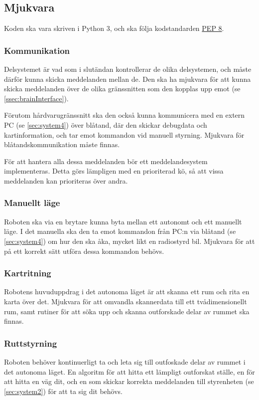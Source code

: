 \documentclass[a4paper,11pt]{article}
\begin{document}
\subsection{Mjukvara}

Koden ska vara skriven i Python 3, och ska följa kodstandarden \href{https://www.python.org/dev/peps/pep-0008/}{PEP 8}.

\subsubsection{Kommunikation}
Delsystemet är vad som i slutändan kontrollerar de olika delsystemen, och måste därför kunna skicka meddelanden mellan de. Den ska ha mjukvara för att kunna skicka meddelanden över de olika gränssnitten som den kopplas upp emot (se \ref{ssec:brainInterface}).

Förutom hårdvarugränssnitt ska den också kunna kommunicera med en extern PC (se \ref{sec:system4}) över blåtand, där den skickar debugdata och kartinformation, och tar emot kommandon vid manuell styrning. Mjukvara för blåtandskommunikation måste finnas.

För att hantera alla dessa meddelanden bör ett meddelandesystem implementeras. Detta görs lämpligen med en prioriterad kö, så att vissa meddelanden kan prioriteras över andra.

\subsubsection{Manuellt läge}
Roboten ska via en brytare kunna byta mellan ett autonomt och ett manuellt läge. I det manuella ska den ta emot kommandon från PC:n via blåtand (se \ref{sec:system4}) om hur den ska åka, mycket likt en radiostyrd bil. Mjukvara för att på ett korrekt sätt utföra dessa kommandon behövs.

\subsubsection{Kartritning}
Robotens huvuduppdrag i det autonoma läget är att skanna ett rum och rita en karta över det. Mjukvara för att omvandla skannerdata till ett tvådimensionellt rum, samt rutiner för att söka upp och skanna outforskade delar av rummet ska finnas.

\subsubsection{Ruttstyrning}
Roboten behöver kontinuerligt ta och leta sig till outfoskade delar av rummet i det autonoma läget. En algoritm för att hitta ett lämpligt outforskat ställe, en för att hitta en väg dit, och en som skickar korrekta meddelanden till styrenheten (se \ref{sec:system2}) för att ta sig dit behövs.
\end{document}
